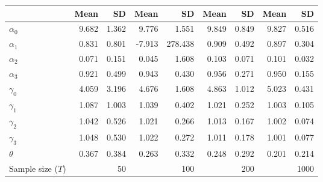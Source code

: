 
\begin{tabular}[t]{lrrrrrrrr}
\toprule
  & Mean & SD & Mean  & SD  & Mean   & SD   & Mean    & SD   \\
\midrule
$\alpha_{0}$ & 9.682 & 1.362 & 9.776 & 1.551 & 9.849 & 0.849 & 9.827 & 0.516\\
$\alpha_{1}$ & 0.831 & 0.801 & -7.913 & 278.438 & 0.909 & 0.492 & 0.897 & 0.304\\
$\alpha_{2}$ & 0.071 & 0.151 & 0.045 & 1.608 & 0.103 & 0.071 & 0.101 & 0.032\\
$\alpha_{3}$ & 0.921 & 0.499 & 0.943 & 0.430 & 0.956 & 0.271 & 0.950 & 0.155\\
$\gamma_{0}$ & 4.059 & 3.196 & 4.676 & 1.608 & 4.863 & 1.012 & 5.023 & 0.431\\
$\gamma_{1}$ & 1.087 & 1.003 & 1.039 & 0.402 & 1.021 & 0.252 & 1.003 & 0.105\\
$\gamma_{2}$ & 1.042 & 0.526 & 1.021 & 0.266 & 1.013 & 0.167 & 1.002 & 0.074\\
$\gamma_{3}$ & 1.048 & 0.530 & 1.022 & 0.272 & 1.011 & 0.178 & 1.001 & 0.077\\
$\theta$ & 0.367 & 0.384 & 0.263 & 0.332 & 0.248 & 0.292 & 0.201 & 0.214\\
Sample size ($T$) &  & 50 &  & 100 &  & 200 &  & 1000\\
\bottomrule
\end{tabular}
